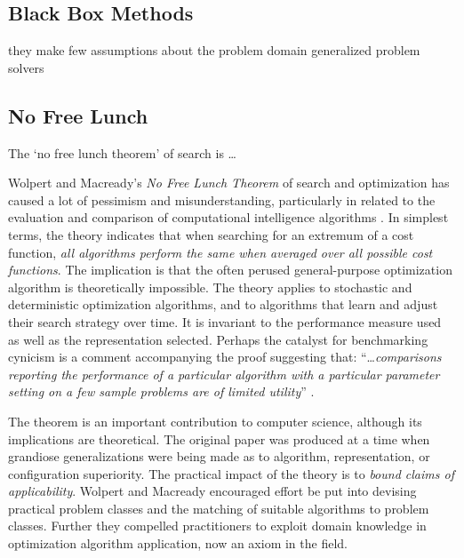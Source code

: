 \documentclass[a4paper, 11pt]{article}
\begin{document}
% 
% 
\subsection{Black Box Methods}
\label{subsec:black_box}
they make few assumptions about the problem domain
generalized problem solvers



% 
% 
\subsection{No Free Lunch}
\label{subsec:nfl}
The `no free lunch theorem' of search is \ldots

Wolpert and Macready's \emph{No Free Lunch Theorem} of search and optimization has caused a lot of pessimism and misunderstanding, particularly in related to the evaluation and comparison of computational intelligence algorithms \cite{Wolpert1997, Wolpert1995}. In simplest terms, the theory indicates that when searching for an extremum of a cost function, \emph{all algorithms perform the same when averaged over all possible cost functions}. The implication is that the often perused general-purpose optimization algorithm is theoretically impossible. The theory applies to stochastic and deterministic optimization algorithms, and to algorithms that learn and adjust their search strategy over time. It is invariant to the performance measure used as well as the representation selected. Perhaps the catalyst for benchmarking cynicism is a comment accompanying the proof suggesting that: ``\ldots \emph{comparisons reporting the performance of a particular algorithm with a particular parameter setting on a few sample problems are of limited utility}'' \cite{Wolpert1997}.

The theorem is an important contribution to computer science, although its implications are theoretical. The original paper was produced at a time when grandiose generalizations were being made as to algorithm, representation, or configuration superiority. The practical impact of the theory is to \emph{bound claims of applicability}. Wolpert and Macready encouraged effort be put into devising practical problem classes and the matching of suitable algorithms to problem classes. Further they compelled practitioners to exploit domain knowledge in optimization algorithm application, now an axiom in the field.


% 
% 
\end{document}
